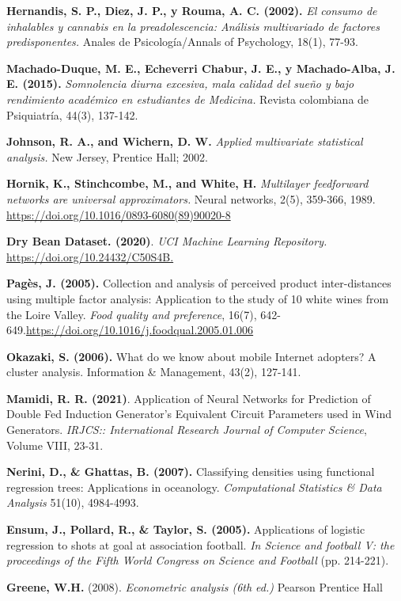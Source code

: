 \begin{thebibliography}{99}
\textbf{Hernandis, S. P., Diez, J. P., y Rouma, A. C. (2002).} \textit{El consumo de inhalables y cannabis en la preadolescencia: Análisis multivariado de factores predisponentes.} Anales de Psicología/Annals of Psychology, 18(1), 77-93.

 \textbf{Machado-Duque, M. E., Echeverri Chabur, J. E., y Machado-Alba, J. E. (2015).}\textit{ Somnolencia diurna excesiva, mala calidad del sueño y bajo rendimiento académico en estudiantes de Medicina.} Revista colombiana de Psiquiatría, 44(3), 137-142.

 \textbf{Johnson, R. A., and Wichern, D. W. } \emph{Applied multivariate statistical analysis.} New Jersey, Prentice Hall; 2002.


 \textbf{Hornik, K., Stinchcombe, M., and White, H. } \emph{Multilayer feedforward networks are universal approximators.} Neural networks, 2(5), 359-366, 1989.
\url{https://doi.org/10.1016/0893-6080(89)90020-8}

 \textbf{Dry Bean Dataset. (2020)}.\emph{ UCI Machine Learning Repository.} \url{https://doi.org/10.24432/C50S4B.}

\textbf{Pagès, J. (2005).} Collection and analysis of perceived product inter-distances using multiple factor analysis: Application to the study of 10 white wines from the Loire Valley. \emph{Food quality and preference}, 16(7), 642-649.\url{https://doi.org/10.1016/j.foodqual.2005.01.006
}

\textbf{Okazaki, S. (2006).} What do we know about mobile Internet adopters? A cluster analysis. Information \& Management, 43(2), 127-141. 

\textbf{Mamidi, R. R. (2021)}. Application of Neural Networks for Prediction of Double Fed Induction Generator’s Equivalent Circuit Parameters used in Wind Generators. \emph{IRJCS:: International Research Journal of Computer Science}, Volume VIII, 23-31.

\textbf{Nerini, D., \& Ghattas, B. (2007).} Classifying densities using functional regression trees: Applications in oceanology. \emph{Computational Statistics \& Data Analysis} 51(10), 4984-4993.

\textbf{Ensum, J., Pollard, R., \& Taylor, S. (2005).} Applications of logistic regression to shots at goal at association football. \emph{In Science and football V: the proceedings of the Fifth World Congress on Science and Football} (pp. 214-221).

\textbf{Greene,  W.H.} (2008). \emph{Econometric analysis (6th ed.)} Pearson Prentice Hall
\end{thebibliography}
 